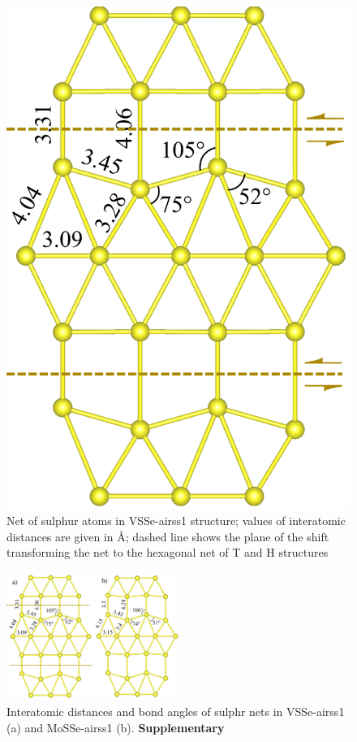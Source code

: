 \documentclass[a4paperm]{article}
\begin{document}
\begin{figure}
	\includegraphics[width=\textwidth]{airss1v_s.png}
	\caption{Net of sulphur atoms in VSSe-airss1 structure; values of interatomic distances are given in \AA; dashed line shows the plane of the shift transforming the net to the hexagonal net of T and H structures}
\label{airss1_s}
\end{figure}

\begin{figure}
	\includegraphics[width=0.5\textwidth]{airss1_s_comp.png}
	\caption{Interatomic distances and bond angles of sulphr nets in VSSe-airss1 (a) and MoSSe-airss1 (b). \bf{Supplementary}}
\label{airss1_s_comp}
\end{figure}
\end{document}
